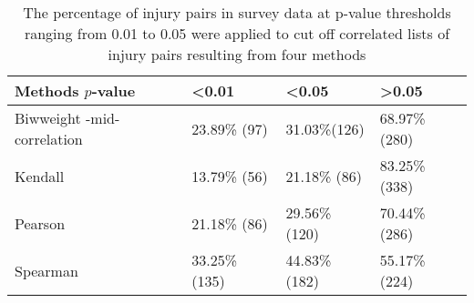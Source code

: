 \begin{table}[]
\centering
\caption{The percentage of injury pairs in survey data at p-value thresholds ranging from 0.01 to 0.05 were applied to cut off correlated lists of injury pairs resulting from four methods}
\label{my-label}
\begin{tabular}{llll}
\hline
Methods $p$-value            & \textless 0.01 & \textless 0.05 & \textgreater 0.05 \\
\hline
Biwweight -mid-correlation & 23.89\% (97)             & 31.03\%(126)            & 68.97\% (280)               \\
Kendall                    & 13.79\% (56)             & 21.18\% (86)             & 83.25\% (338)               \\
Pearson                    & 21.18\% (86)             & 29.56\% (120)            & 70.44\% (286)               \\
Spearman                   & 33.25\% (135)            & 44.83\% (182)            & 55.17\% (224)              \\
\hline
\end{tabular}
\end{table}